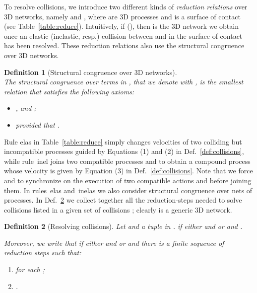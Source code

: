 \documentclass[11pt]{article}
\def\name#1{\mbox{\sc #1}}
\newtheorem{definition}{Definition}
\begin{document}
To resolve collisions, we introduce two different kinds of {\em reduction relations} over 3D
networks, namely  and , where  are 3D processes and  is a surface of contact (see Table~\ref{table:reduce}). Intuitively, if  (), then  is the 3D network we obtain once an elastic (inelastic, resp.) collision between  and  in the surface of contact  has been resolved. These reduction relations also use the structural congruence over 3D networks.

\begin{definition}[Structural congruence over 3D networks]\label{def:congruencenets}
\ \\ The structural congruence over terms in , that we denote with , is the
smallest relation that satisfies the following axioms:

\begin{itemize}
\item [-] ,   and ;

\item [-]  provided that .
\end{itemize}
\end{definition}

Rule \name{elas} in Table~\ref{table:reduce} simply changes velocities of two colliding but
incompatible processes guided by Equations (1) and (2) in Def.~\ref{def:collisions}, while
rule~\name{inel} joins two compatible processes  and  to obtain a compound process
whose velocity is given by Equation (3) in Def.~\ref{def:collisions}. Note that we force  and 
to synchronize on the execution of two compatible actions  and
 before joining them. In rules~\name{elas}
and~\name{inelas} we also consider structural congruence over nets of processes.
In Def.~\ref{def:reductionrules} we collect together all the reduction-steps needed to
solve collisions listed in a given set of collisions ; clearly  is a generic  3D
network.

\begin{definition}[Resolving  collisions]
\label{def:reductionrules}
Let  and  a tuple in .  if either  and  or  and .

Moreover, we write that  if either  and   or
 and there is a finite sequence of reduction
steps  such that:
\begin{enumerate}
\item  for each ;
\item .
\end{enumerate}
\end{definition}


\begin{table}[tbh]

\caption{Reaction rules for elastic and inelastic collisions}
\label{table:reduce}
\end{table}
\end{document}

